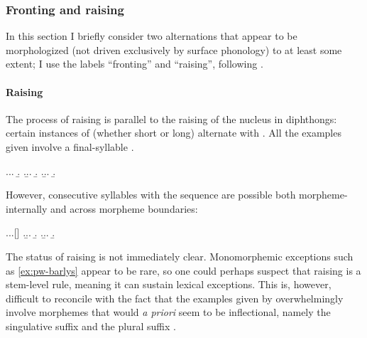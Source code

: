\subsubsection{Fronting and raising}
\label{sec:fronting}

In this section I briefly consider two alternations that appear to be morphologized (\ie not driven exclusively by surface phonology) to at least some extent; I use the labels \enquote{fronting} and \enquote{raising}, following \citet{awbery86:_pembr_welsh}.

\paragraph{Raising}
\label{sec:raising:-data}

The process of raising is parallel to the raising of the nucleus in \ipa{[ai]} diphthongs: certain instances of \ipa{[a]} (whether short or long) alternate with \ipa{[e]}. All the examples given involve a final-syllable \ipa{[i]}.

\ex.\a.\a.
\b.\label{ex:pw-aderyn}
\z.\b.\a.
\b.\label{ex:pw-plentyn}
\z.\b.\a.
\b.

However, consecutive syllables with the sequence \ipa{[a\ldots i]} are possible both morpheme\hyp internally and across morpheme boundaries:

\ex.\a.\label{ex:pw-barlys}\a.[]
\z.\b.\a.
\b.\label{ex:pw-gofalus}
\z.\b.\a.
\b.\label{ex:pw-hadyn}


The status of raising is not immediately clear. Monomorphemic exceptions such as \ref{ex:pw-barlys} appear to be rare, so one could perhaps suspect that raising is a stem-level rule, meaning it can sustain lexical exceptions. This is, however, difficult to reconcile with the fact that the examples given by \citet{awbery86:_pembr_welsh} overwhelmingly involve morphemes that would \emph{a priori} seem to be inflectional, namely the singulative suffix  and the plural suffix .


